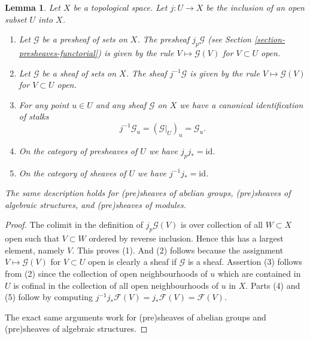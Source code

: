 \documentclass{stacks-project}
\theoremstyle{plain}
\newtheorem{lemma}[subsection]{Lemma}
\theoremstyle{definition}
\theoremstyle{remark}
\numberwithin{equation}{subsection}
\begin{document}
\begin{lemma}
\label{lemma-j-pullback}
Let $X$ be a topological space.
Let $j : U \to X$ be the inclusion of an open subset $U$ into $X$.
\begin{enumerate}
\item Let $\mathcal{G}$ be a presheaf of sets on $X$.
The presheaf $j_p\mathcal{G}$
(see Section \ref{section-presheaves-functorial}) is given by the rule
$V \mapsto \mathcal{G}(V)$ for $V \subset U$ open.
\item Let $\mathcal{G}$ be a sheaf of sets on $X$.
The sheaf $j^{-1}\mathcal{G}$ is given by the rule
$V \mapsto \mathcal{G}(V)$ for $V \subset U$ open.
\item For any point $u \in U$ and any sheaf $\mathcal{G}$ on $X$
we have a canonical identification of stalks
$$
j^{-1}\mathcal{G}_u = (\mathcal{G}|_U)_u = \mathcal{G}_u.
$$
\item On the category of presheaves of $U$ we have $j_pj_* = \text{id}$.
\item On the category of sheaves of $U$ we have $j^{-1}j_* = \text{id}$.
\end{enumerate}
The same description holds for (pre)sheaves of abelian groups,
(pre)sheaves of algebraic structures, and (pre)sheaves of modules.
\end{lemma}

\begin{proof}
The colimit in the definition of $j_p\mathcal{G}(V)$
is over collection of all $W \subset X$ open such that $V \subset W$
ordered by reverse inclusion.
Hence this has a largest element, namely $V$. This proves (1).
And (2) follows because the assignment $V \mapsto \mathcal{G}(V)$
for $V \subset U$ open is clearly a sheaf if $\mathcal{G}$ is a
sheaf. Assertion (3) follows from (2) since the collection
of open neighbourhoods of $u$ which are contained in $U$ is cofinal
in the collection of all open neighbourhoods of $u$ in $X$.
Parts (4) and (5) follow by computing
$j^{-1}j_*\mathcal{F}(V) = j_*\mathcal{F}(V) = \mathcal{F}(V)$.

\medskip\noindent
The exact same arguments work for (pre)sheaves of abelian groups
and (pre)sheaves of algebraic structures.
\end{proof}
\end{document}

